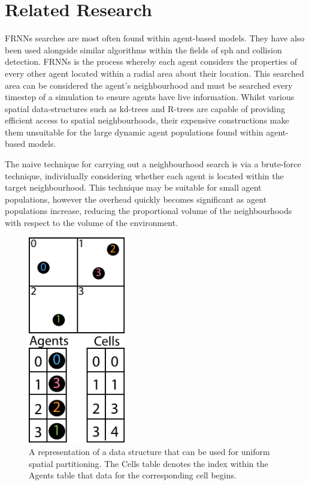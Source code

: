\vspace{-0.3cm}
\section{Related Research\label{sec:related-work}}
\vspace{-0.4cm}
  FRNNs searches are most often found within agent-based models. They have also been used alongside similar algorithms within the fields of \gls{sph} and collision detection. FRNNs is the process whereby each agent considers the properties of every other agent located within a radial area about their location. This searched area can be considered the agent’s neighbourhood and must be searched every timestep of a simulation to ensure agents have live information. Whilst various spatial data-structures such as kd-trees and R-trees are capable of providing efficient access to spatial neighbourhoods, their expensive constructions make them unsuitable for the large dynamic agent populations found within agent-based models.

  The naive technique for carrying out a neighbourhood search is via a brute-force technique, individually considering whether each agent is located within the target neighbourhood. This technique may be suitable for small agent populations, however the overhead quickly becomes significant as agent populations increase, reducing the proportional volume of the neighbourhoods with respect to the volume of the environment.
  
\begin{figure}
\vspace{-0.4cm}
  \begin{center}
    \includegraphics[width=0.38\textwidth]{../resources/usp/usp.pdf}
  \end{center}
\vspace{-0.4cm}
  \caption{\label{fig:usp} A representation of a data structure that can be used for uniform spatial partitioning. The Cells table denotes the index within the Agents table that data for the corresponding cell begins.}
\end{figure}
  
